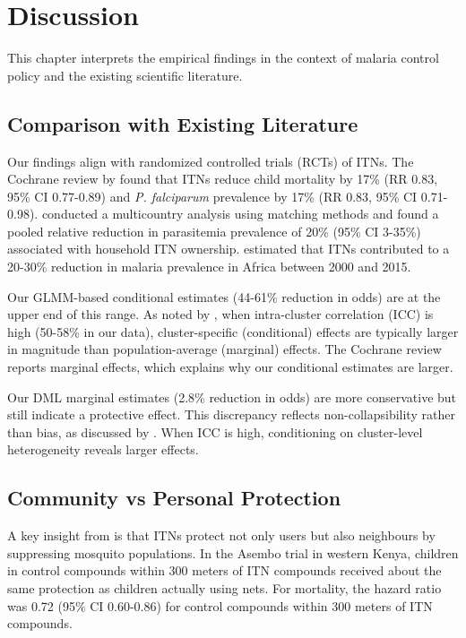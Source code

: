 \chapter{Discussion}

This chapter interprets the empirical findings in the context of malaria control policy and the existing scientific literature.

\section{Comparison with Existing Literature}

Our findings align with randomized controlled trials (RCTs) of ITNs. The Cochrane review by \citet{pryce2018insecticide} found that ITNs reduce child mortality by 17\% (RR 0.83, 95\% CI 0.77-0.89) and \textit{P. falciparum} prevalence by 17\% (RR 0.83, 95\% CI 0.71-0.98). \citet{lim2011net} conducted a multicountry analysis using matching methods and found a pooled relative reduction in parasitemia prevalence of 20\% (95\% CI 3-35\%) associated with household ITN ownership. \citet{bhatt2015effect} estimated that ITNs contributed to a 20-30\% reduction in malaria prevalence in Africa between 2000 and 2015.

Our GLMM-based conditional estimates (44-61\% reduction in odds) are at the upper end of this range. As noted by \citet{neuhaus1991comparison}, when intra-cluster correlation (ICC) is high (50-58\% in our data), cluster-specific (conditional) effects are typically larger in magnitude than population-average (marginal) effects. The Cochrane review reports marginal effects, which explains why our conditional estimates are larger.

Our DML marginal estimates (2.8\% reduction in odds) are more conservative but still indicate a protective effect. This discrepancy reflects non-collapsibility rather than bias, as discussed by \citet{greenland1999confounding}. When ICC is high, conditioning on cluster-level heterogeneity reveals larger effects.

\section{Community vs Personal Protection}

A key insight from \citet{hawley2003community} is that ITNs protect not only users but also neighbours by suppressing mosquito populations. In the Asembo trial in western Kenya, children in control compounds within 300 meters of ITN compounds received about the same protection as children actually using nets. For mortality, the hazard ratio was 0.72 (95\% CI 0.60-0.86) for control compounds within 300 meters of ITN compounds.

